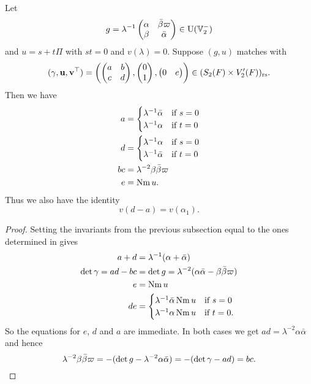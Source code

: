 \begin{lemma}
  \label{lem:finale_match}
  Let
  \[ g = \lambda^{-1} \begin{pmatrix}
    \alpha & \bar\beta \varpi \\
    \beta & \bar\alpha
    \end{pmatrix} \in \operatorname{U}(\mathbb V_2^-) \]
  and $u = s + t \Pi$ with $s t = 0$ and $v(\lambda) = 0$.
  Suppose $(g,u)$ matches with
  \[ (\gamma, \mathbf u, \mathbf v^\top) = \left( \begin{pmatrix} a & b \\ c & d \end{pmatrix},
    \begin{pmatrix} 0 \\ 1 \end{pmatrix}, \begin{pmatrix} 0 & e \end{pmatrix} \right)
    \in (S_2(F) \times V'_2(F))_{\mathrm{rs}}. \]
  Then we have
  \begin{align*}
    a &= \begin{cases}
      \lambda^{-1} \bar\alpha & \text{if } s = 0 \\
      \lambda^{-1} \alpha & \text{if } t = 0 \\
    \end{cases} \\
    d &= \begin{cases}
      \lambda^{-1} \alpha & \text{if } s = 0 \\
      \lambda^{-1} \bar\alpha & \text{if } t = 0 \\
    \end{cases} \\
    bc &= \lambda^{-2} \beta \bar\beta \varpi \\
    e &= \operatorname{Nm} u.
  \end{align*}
  Thus we also have the identity
  \[ v(d - a) = v(\alpha_1). \]
\end{lemma}
\begin{proof}
  Setting the invariants from the previous subsection equal
  to the ones determined in  gives
  \begin{align*}
    a + d &= \lambda^{-1} (\alpha + \bar\alpha) \\
    \det \gamma = ad - bc &= \det g = \lambda^{-2} (\alpha \bar\alpha - \beta \bar\beta \varpi) \\
    e &= \operatorname{Nm} u \\
    de &= \begin{cases}
      \lambda^{-1} \bar\alpha \operatorname{Nm} u & \text{if } s = 0 \\
      \lambda^{-1} \alpha \operatorname{Nm} u & \text{if } t = 0.
    \end{cases}
  \end{align*}
  So the equations for $e$, $d$ and $a$ are immediate.
  In both cases we get $ad = \lambda^{-2} \alpha \bar \alpha$ and hence
  \[ \lambda^{-2} \beta \bar \beta \varpi
    = -(\det g -  \lambda^{-2} \alpha \bar \alpha)
    = -(\det \gamma - ad) = bc. \qedhere \]
\end{proof}

